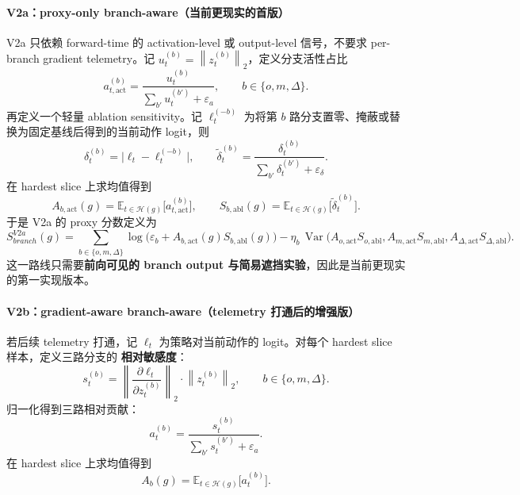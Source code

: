 \documentclass[11pt,a4paper]{ctexart}
\newcommand{\E}{\mathbb{E}}
\newcommand{\Var}{\operatorname{Var}}
\newcommand{\norm}[1]{\left\lVert #1 \right\rVert}
\begin{document}
\paragraph{V2a：proxy-only branch-aware（当前更现实的首版）}
V2a 只依赖 forward-time 的 activation-level 或 output-level 信号，不要求 per-branch gradient telemetry。记 \(u_t^{(b)}=\norm{z_t^{(b)}}_2\)，定义分支活性占比
\begin{equation}
 a_{t,\mathrm{act}}^{(b)} = \frac{u_t^{(b)}}{\sum_{b'} u_t^{(b')}+\varepsilon_a},
 \qquad b\in\{o,m,\Delta\}.
 \label{eq:branch_act_ratio}
\end{equation}
再定义一个轻量 ablation sensitivity。记 \(\ell_t^{(-b)}\) 为将第 \(b\) 路分支置零、掩蔽或替换为固定基线后得到的当前动作 logit，则
\begin{equation}
 \delta_t^{(b)} = \big|\ell_t-\ell_t^{(-b)}\big|,\qquad
 \tilde\delta_t^{(b)} = \frac{\delta_t^{(b)}}{\sum_{b'}\delta_t^{(b')}+\varepsilon_\delta}.
 \label{eq:branch_ablation}
\end{equation}
在 hardest slice 上求均值得到
\begin{equation}
 A_{b,\mathrm{act}}(g)=\E_{t\in\mathcal{H}(g)}\big[a_{t,\mathrm{act}}^{(b)}\big],\qquad
 S_{b,\mathrm{abl}}(g)=\E_{t\in\mathcal{H}(g)}\big[\tilde\delta_t^{(b)}\big].
 \label{eq:branch_proxy_stats}
\end{equation}
于是 V2a 的 proxy 分数定义为
\begin{equation}
S_{branch}^{V2a}(g)=\sum_{b\in\{o,m,\Delta\}}\log\big(\varepsilon_b + A_{b,\mathrm{act}}(g)S_{b,\mathrm{abl}}(g)\big)
- \eta_b\,\Var\big(A_{o,\mathrm{act}}S_{o,\mathrm{abl}}, A_{m,\mathrm{act}}S_{m,\mathrm{abl}}, A_{\Delta,\mathrm{act}}S_{\Delta,\mathrm{abl}}\big).
\label{eq:sbranch_v2a}
\end{equation}
这一路线只需要\textbf{前向可见的 branch output 与简易遮挡实验}，因此是当前更现实的第一实现版本。

\paragraph{V2b：gradient-aware branch-aware（telemetry 打通后的增强版）}
若后续 telemetry 打通，记 \(\ell_t\) 为策略对当前动作的 logit。对每个 hardest slice 样本，定义三路分支的 \textbf{相对敏感度}：
\begin{equation}
 s_t^{(b)} = \norm{\frac{\partial \ell_t}{\partial z_t^{(b)}}}_2\cdot \norm{z_t^{(b)}}_2,
 \qquad b\in\{o,m,\Delta\}.
 \label{eq:sensitivity}
\end{equation}
归一化得到三路相对贡献：
\begin{equation}
 a_t^{(b)} = \frac{s_t^{(b)}}{\sum_{b'} s_t^{(b')}+\varepsilon_a}.
 \label{eq:branch_ratio}
\end{equation}
在 hardest slice 上求均值得到
\begin{equation}
 A_b(g)=\E_{t\in\mathcal{H}(g)}\big[a_t^{(b)}\big].
 \label{eq:Ab}
\end{equation}
\end{document}
